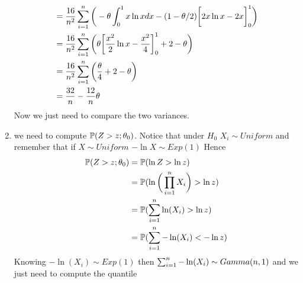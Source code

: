 \begin{enumerate}
\[\begin{split}
	&=\frac{16}{n^2}\sum_{i=1}^n \bigg( -\theta \int_{0}^{1}x \ln x dx -(1- \theta/2)\bigg[2x\ln x -2x \bigg]_0^1 \bigg)\\
	&=\frac{16}{n^2}\sum_{i=1}^n \bigg( \theta\bigg[\frac{x^2}{2}\ln x -\frac{x^2}{4}\bigg]_0^1 +2-\theta \bigg)\\
	&=\frac{16}{n^2}\sum_{i=1}^n \bigg( \frac{\theta}{4} +2 -\theta \bigg)\\
	&=\frac{32}{n}-\frac{12}{n}\theta
	\end{split}
	\]
	Now we just need to compare the two variances.
	\item we need to compute $\mathbb{P}(Z>z ;\theta_0)$. Notice that under $H_0$ $X_i\sim Uniform$ and remember that if $X\sim Uniform$ $-\ln X \sim Exp (1)$ Hence
	\[
	\begin{split}
	\mathbb{P}(Z>z ;\theta_0)
	&=\mathbb{P}(\ln Z> \ln z)\\
	&=\mathbb{P}(\ln\bigg(\prod_{i=1}^{n}X_i\bigg)> \ln z)\\
	&=\mathbb{P}(\sum_{i=1}^n \ln(X_i)> \ln z)\\
	&=\mathbb{P}(\sum_{i=1}^n - \ln(X_i)<-\ln z)
	\end{split}
	\]
	Knowing $ - \ln(X_i)\sim Exp(1)$ then $\sum_{i=1}^n - \ln(X_i) \sim Gamma(n,1)$ and we just need to compute the quantile
\end{enumerate}



